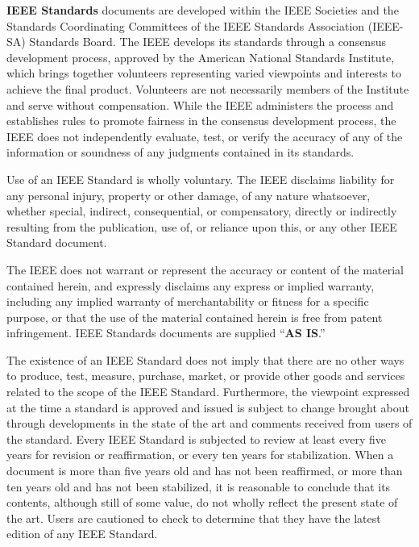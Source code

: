 \thispagestyle{empty}
\begingroup
\fontsize{8.8}{10.45}\selectfont
\setlength{\parskip}{7.0pt plus .5pt minus .5pt}

\textbf{IEEE Standards} documents are developed within the IEEE Societies and the Standards Coordinating Committees of the IEEE Standards Association (IEEE-SA) Standards Board. The IEEE develops its standards through a consensus development process, approved by the American National Standards Institute, which brings together volunteers representing varied viewpoints and interests to achieve the final product. Volunteers are not necessarily members of the Institute and serve without compensation. While the IEEE administers the process and establishes rules to promote fairness in the consensus development process, the IEEE does not independently evaluate, test, or verify the accuracy of any of the information or soundness of any judgments contained in its standards.

Use of an IEEE Standard is wholly voluntary. The IEEE disclaims liability for any personal injury, property or other damage, of any nature whatsoever, whether special, indirect, consequential, or compensatory, directly or indirectly resulting from the publication, use of, or reliance upon this, or any other IEEE Standard document.

The IEEE does not warrant or represent the accuracy or content of the material contained herein, and expressly disclaims any express or implied warranty, including any implied warranty of merchantability or fitness for a specific purpose, or that the use of the material contained herein is free from patent infringement. IEEE Standards documents are supplied ``\textbf{AS IS}.''

The existence of an IEEE Standard does not imply that there are no other ways to produce, test, measure, purchase, market, or provide other goods and services related to the scope of the IEEE Standard. Furthermore, the viewpoint expressed at the time a standard is approved and issued is subject to change brought about through developments in the state of the art and comments received from users of the standard. Every IEEE Standard is subjected to review at least every five years for revision or reaffirmation, or every ten years for stabilization. When a document is more than five years old and has not been reaffirmed, or more than ten years old and has not been stabilized, it is reasonable to conclude that its contents, although still of some value, do not wholly reflect the present state of the art. Users are cautioned to check to determine that they have the latest edition of any IEEE Standard.

